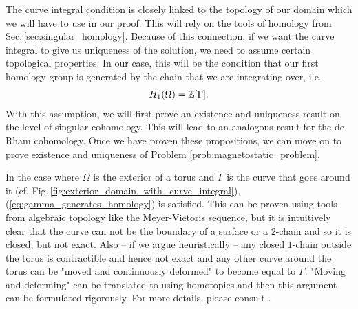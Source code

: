 \documentclass[../master_thesis.tex]{subfiles}
\begin{document}
The curve integral condition is closely linked to the topology of our domain 
which we will have to use in our proof.
This will rely on the tools of homology from Sec.\,\ref{sec:singular_homology}. 
Because of this connection, if we want the curve integral
to give us uniqueness of the solution, we need to assume certain topological 
properties. In our case, this will be the condition that our first 
homology group is generated by the chain that we are integrating over, i.e.
\begin{align}
    H_1(\Omega) = \mathbb{Z} [\Gamma].\label{eq:gamma_generates_homology}
\end{align}
With this assumption, we will first prove an existence and uniqueness result on the 
level of singular cohomology. This will lead to an analogous result for the de Rham 
cohomology. Once we have proven these propositions, we can move on to prove existence 
and uniqueness of Problem \ref{prob:magnetostatic_problem}.

\begin{remark}
    In the case where $\Omega$ is the exterior of a torus and $\Gamma$ is the curve
    that goes around it (cf. Fig.\,\ref{fig:exterior_domain_with_curve_integral}),
    (\ref{eq:gamma_generates_homology}) is satisfied. This can be proven using tools from algebraic
    topology like the Meyer-Vietoris sequence, but it is intuitively clear that the curve 
    can not be the boundary of a surface or a $2$-chain and so it is closed, but 
    not exact. Also -- if we argue heuristically -- any closed $1$-chain outside the torus 
    is contractible and hence not exact and any other curve around the torus can 
    be "moved and continuously deformed" to become equal to $\Gamma$. 
    "Moving and deforming" can be translated to using homotopies and then 
    this argument can be formulated rigorously. For more details, please consult 
    \cite[Sec.\,IV]{topology_and_geometry}.
\end{remark}
\end{document}
